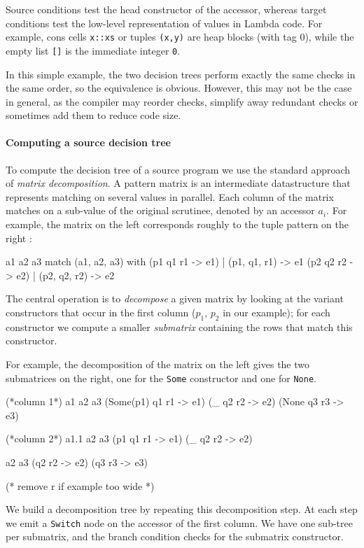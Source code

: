 \documentclass[12pt]{article}
\begin{document}
Source conditions test the head constructor of the accessor, whereas
target conditions test the low-level representation of values in
Lambda code. For example, cons cells \texttt{x::xs} or tuples
\texttt{(x,y)} are heap blocks (with tag 0), while the empty list
\texttt{[]} is the immediate integer \texttt{0}.

In this simple example, the two decision trees perform exactly the
same checks in the same order, so the equivalence is obvious. However,
this may not be the case in general, as the compiler may reorder
checks, simplify away redundant checks or sometimes add them to reduce
code size.

\paragraph{Computing a source decision tree}

To compute the decision tree of a source program we use the standard approach of \emph{matrix decomposition}. A pattern matrix is an intermediate datastructure that represents matching on several values in parallel. Each column of the matrix matches on a sub-value of the original scrutinee, denoted by an accessor $a_i$. For example, the matrix on the left corresponds roughly to the tuple pattern on the right :


   a1 a2 a3                      match (a1, a2, a3) with
  (p1 q1 r1 -> e1)               | (p1, q1, r1) -> e1
  (p2 q2 r2 -> e2)               | (p2, q2, r2) -> e2

The central operation is to \emph{decompose} a given matrix
by looking at the variant constructors that occur in the first column ($p_1$, $p_2$ in our example); for each constructor we compute a smaller \emph{submatrix} containing the rows that match this constructor.


For example, the decomposition of the matrix on the left gives the two submatrices on the right,
one for the \texttt{Some} constructor and one for \texttt{None}.

(*column 1*)
   a1       a2 a3
  (Some(p1) q1 r1 -> e1)
  (_        q2 r2 -> e2)
  (None     q3 r3 -> e3)

(*column 2*)
   a1.1 a2 a3
  (p1   q1 r1 -> e1)
  (_    q2 r2 -> e2)

   a2 a3
  (q2 r2 -> e2)
  (q3 r3 -> e3)

(* remove r if example too wide *)

We build a decomposition tree by repeating this decomposition step. At each step we emit a \texttt{Switch} node on the accessor of the first column. We have one sub-tree per submatrix, and the branch condition checks for the submatrix constructor.
\end{document}
